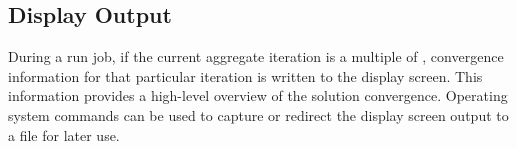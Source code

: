 \subsection{Display Output}
\label{SEC:Files:Display_Output}


During a run job, if the current aggregate iteration is a multiple of
,
convergence information for that particular iteration is written to
the display screen.
%
This information provides a high-level overview of the solution convergence.
%
Operating system commands can be used to capture or redirect the
display screen output to a file for later use.







